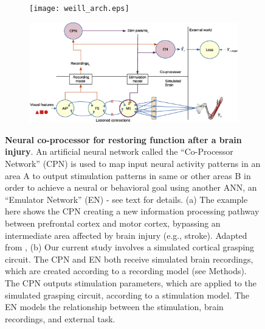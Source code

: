 \documentclass[12pt]{iopart}
\begin{document}
\begin{figure}
    \centering
    \begin{subfigure}[c]{0.88\textwidth}
		\centering
		\texttt{[image: weill\_arch.eps]}
		\caption{}
	\end{subfigure}
	\hfill
    \begin{subfigure}[c]{0.88\textwidth}
		\centering
		\includegraphics[width=\textwidth]{cpn_michaels_arch_labeled.eps}
		\caption{}
	\end{subfigure}
	\hfill
    \caption{{\bf Neural co-processor for restoring function after a brain injury}.
    An artificial neural network called the “Co-Processor Network” (CPN) is used to
    map input neural activity patterns in an area A to output stimulation patterns
    in same or other areas B in order to achieve a neural or behavioral goal using
    another ANN, an “Emulator Network” (EN) - see text for details. (a) The example
    here shows the CPN creating a new information processing pathway between prefrontal
    cortex and motor cortex, bypassing an intermediate area affected by brain injury
    (e.g., stroke). Adapted from \cite{rao.coproc}, (b) Our current study involves a
    simulated cortical grasping circuit. The CPN and EN both receive simulated brain
    recordings, which are created according to a recording model (see Methods).
    The CPN outputs stimulation parameters, which are applied to the simulated
    grasping circuit, according to a stimulation model. The EN models the relationship between
    the     stimulation, brain recordings, and external task.}
    \label{fig:arch}
\end{figure}
\end{document}
